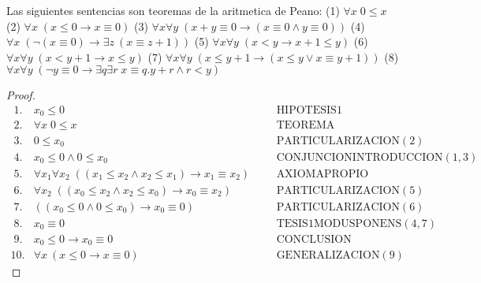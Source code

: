  \begin{lemma}
    Las siguientes sentencias son teoremas de la aritmetica de Peano:
    (1) \(\forall x\;0\leq x\)
    (2) \(\forall x\;(x\leq 0\rightarrow x\equiv 0)\)
    (3) \(\forall x\forall y\;(x+y\equiv 0\rightarrow (x\equiv 0\wedge y\equiv 0))\)
    (4) \(\forall x\;(\lnot (x\equiv 0)\rightarrow \exists z\ (x\equiv z+1))\)
    (5) \(\forall x\forall y\;(x< y\rightarrow x+1\leq y)\)
    (6) \(\forall x\forall y\;(x< y+1\rightarrow x\leq y)\)
    (7) \(\forall x\forall y\;(x\leq y+1\rightarrow (x\leq y\vee x\equiv y+1))\)
    (8) \(\forall x\forall y\;(\lnot y\equiv 0\rightarrow \exists q\exists r\;x\equiv q.y+r\wedge r< y)\)
  \end{lemma}
  \begin{proof}
    \(\displaystyle \begin{array}{lllll} \;1. & x_{0}\leq 0 & & & \text{HIPOTESIS}1 \\ \;2. & \forall x\;0\leq x & & & \text{TEOREMA} \\ \;3. & 0\leq x_{0} & & & \text{PARTICULARIZACION}(2) \\ \;4. & x_{0}\leq 0\wedge 0\leq x_{0} & & & \text{CONJUNCIONINTRODUCCION} (1,3) \\ \;5. & \forall x_{1}\forall x_{2}\;((x_{1}\leq x_{2}\wedge x_{2}\leq x_{1})\rightarrow x_{1}\equiv x_{2}) & & & \text{AXIOMAPROPIO} \\ \;6. & \forall x_{2}\;((x_{0}\leq x_{2}\wedge x_{2}\leq x_{0})\rightarrow x_{0}\equiv x_{2}) & & & \text{PARTICULARIZACION}(5) \\ \;7. & ((x_{0}\leq 0\wedge 0\leq x_{0})\rightarrow x_{0}\equiv 0) & & & \text{PARTICULARIZACION}(6) \\ \;8. & x_{0}\equiv 0 & & & \text{TESIS}1\text{MODUSPONENS}(4,7) \\ \;9. & x_{0}\leq 0\rightarrow x_{0}\equiv 0 & & & \text{CONCLUSION} \\ 10. & \forall x\ (x\leq 0\rightarrow x\equiv 0) & & & \text{GENERALIZACION} (9) \end{array} \)


\end{proof}
